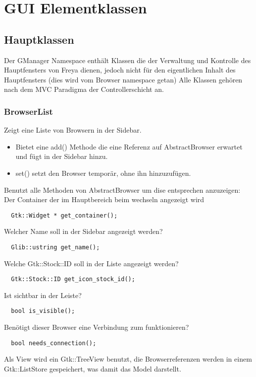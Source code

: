 \section{GUI Elementklassen}

\subsection{Hauptklassen}
Der GManager Namespace enthält Klassen die der Verwaltung und Kontrolle des Hauptfensters von Freya dienen,
jedoch nicht für den eigentlichen Inhalt des Hauptfensters (dies wird vom Browser namespace getan)
Alle Klassen gehören nach dem MVC Paradigma der Controllerschicht an.


\subsubsection{BrowserList}
Zeigt eine Liste von Browsern in der Sidebar.
\begin{itemize} 
\item Bietet eine add() Methode die eine Referenz auf AbstractBrowser erwartet und fügt in der Sidebar hinzu.
\item set() setzt den Browser temporär, ohne ihn hinzuzufügen.
\end{itemize}
Benutzt alle Methoden von AbstractBrowser um dise entsprechen anzuzeigen:
\\
Der Container der im Hauptbereich beim wechseln angezeigt wird
\begin{verbatim}
  Gtk::Widget * get_container();
\end{verbatim}
Welcher Name soll in der Sidebar angezeigt werden?
\begin{verbatim}
  Glib::ustring get_name();
\end{verbatim}
Welche Gtk::Stock::ID soll in der Liste angezeigt werden?
\begin{verbatim}
  Gtk::Stock::ID get_icon_stock_id();
\end{verbatim} 
Ist sichtbar in der Leiste?
\begin{verbatim}
  bool is_visible(); 
\end{verbatim}
Benötigt dieser Browser eine Verbindung zum funktionieren?
\begin{verbatim}
  bool needs_connection(); 
\end{verbatim}

Als View wird ein Gtk::TreeView benutzt, die Browserreferenzen werden in einem Gtk::ListStore gespeichert,
was damit das Model darstellt. 

